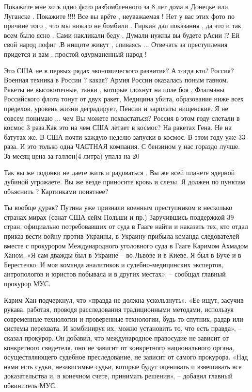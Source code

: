 Покажите мне  хоть одно фото разбомбленного за 8 лет дома в Донецке или
Луганске .  Покажите !!!!  Все вы врёте  ,  неуважаемая  !  Нет у вас этих фото
по причине того , что мы никого не бомбили . Гиркин дал показания  , да это и
так всем было ясно . Сами накликали беду . Думали нужны вы будете  рАсии !?  Ей
свой народ пофиг .В нищите живут ,   спиваясь ...  Отвечать за преступления
придется и вам  , простой одурманенный народ !

Это США не в первых рядах экономического развития? А тогда кто? Россия? Военная
техника в России ? какая? Армия России оказалась поным гавном. Ракеты не
высокоточные, танки , которые глохнут на поле боя , Флагманы Российского флота
тонут от двух ракет, Медицина убита, образование ниже всех пределов, уровень
жизни деградирует, Пенсии и зарплаты нищенские. Я не совсем понимаю ... чем Вы
можете похвастаться? Россия в этом году слетали в космос 3 раза.Как это на чем
США летает в космос? На ракетах Гена. Не на батутах же. В США почти каждую
неделю запуски в космос. В этом году уже 33 раза. И это только одна ЧАСТНАЯ
компания. С бензином у нас гораздо лучше. За месяц цена за галлон(4 литра)
упала на 20%

Так вы же подонки не даете жить и радоваться . Вы же всей планете ядерной
дубиной угрожаете. Вы же везде приносите кровь и слезы. Я должен по пунктам
объяснить ? Картинками понятнее?

Ты вообще дурак? Путина уже признали военным преступником в несколько странах
мирах (сенат США сейм Польши и пр.) Заручившись поддержкой 39 стран, официально
потребовавших от суда в Гааге найти и наказать тех, кто отдал приказ вести
войну против Украины, в Украину прибыла команда следователей вместе с
прокурором Международного уголовного суда в Гааге Каримом Ахмадом Ханом. «Я сам
дважды был в Украине – во Львове и в Киеве. Я был в Буче и в Берестечко. И моя
команда аналитиков и судебно-медицинских экспертов, антропологов и юристов
побывала и в других местах», – сообщал главный прокурор МУС.

Карим Хан подчеркнул, что «правда не должна ускользнуть». «Ее ищут, засучив
рукава, работая, проводя расследования традиционными методами, используя
современные технологии и проверенные технологии, будь то спутник, радар или
системы перехвата. И комбинируя их, можно установить то, что есть правда», –
сказал прокурор. Он добавил, что международное правосудие не зависит от
конкретного свидетеля, оно не зависит от конкретного национального органа,
осуществляющего судебное преследование, не зависит от самого прокурора. «Над
нами есть судьи, независимые судьи, которые будут оценивать и взвешивать все
доказательства и, в конечном счете, принимать решения», – добавил главный
обвинитель МУС.


